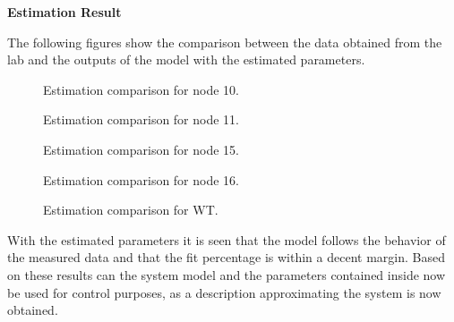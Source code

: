 \textbf{Estimation Result}

The following figures show the comparison between the data obtained from the lab and the outputs of the model with the estimated parameters.  

\begin{figure}[H]
  \centering
  \begin{minipage}[b]{0.45\textwidth}
    
    \caption{Estimation comparison for node 10.}
  \end{minipage}
  \hfill
  \begin{minipage}[b]{0.45\textwidth}
    
    \caption{Estimation comparison for node 11.}
  \end{minipage}
\end{figure}

\begin{figure}[H]
  \centering
  \begin{minipage}[b]{0.45\textwidth}
    
    \caption{Estimation comparison for node 15.}
  \end{minipage}
  \hfill
  \begin{minipage}[b]{0.45\textwidth}
    
    \caption{Estimation comparison for node 16.}
  \end{minipage}
\end{figure}

\begin{figure}[H]
 \centering
    
    \caption{Estimation comparison for WT.}
\end{figure}

With the estimated parameters it is seen that the model follows the behavior of the measured data and that the fit percentage is within a decent margin. 
Based on these results can the system model and the parameters contained inside now be used for control purposes, as a description approximating the 
system is now obtained.   


